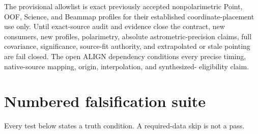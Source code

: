 \documentclass[11pt]{article}
\begin{document}
The provisional allowlist is exact previously accepted nonpolarimetric Point,
OOF, Science, and Beammap profiles for their established coordinate-placement
use only.  Until exact-source audit and evidence close the contract, new
consumers, new profiles, polarimetry, absolute astrometric-precision claims,
full covariance, significance, source-fit authority, and extrapolated or stale
pointing are fail closed.  The open ALIGN dependency conditions every precise
timing, native-source mapping, origin, interpolation, and synthesized-
eligibility claim.

\section{Numbered falsification suite}

Every test below states a truth condition.  A required-data skip is not a pass.
\end{document}
